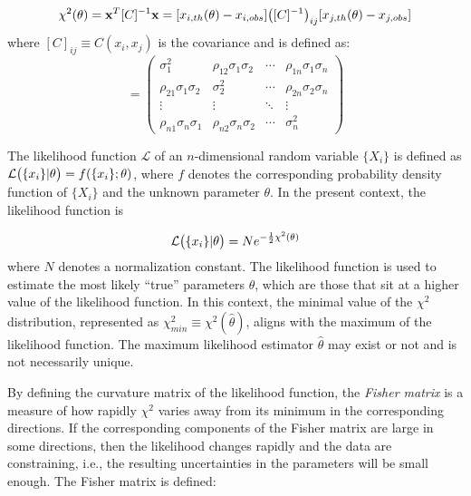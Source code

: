\documentclass[universe,article,accept,moreauthors,pdftex]{Definitions/mdpi}
\begin{document}
\begin{equation}
     \chi^{2}(\theta)=\textbf{x}^{T}[C]^{-1}\textbf{x}=[x_{i,th}(\theta)-x_{i,obs}]\big{(}[C]^{-1}\big{)}_{ij}[x_{j,th}(\theta)-x_{j,obs}]
 \end{equation}
where $[C]_{ij}\equiv C(x_{i},x_{j})$ is the covariance and is defined as:
\begin{equation}
    [C] = 
 \begin{pmatrix}
  \sigma^{2}_{1} & \rho_{12} \sigma_{1}\sigma_{2} & \cdots& \rho_{1n} \sigma_{1}\sigma_{n}\\
   \rho_{21} \sigma_{1}\sigma_{2}&\sigma^{2}_{2}  & \cdots& \rho_{2n} \sigma_{2}\sigma_{n}\\
  \vdots  & \vdots  & \ddots & \vdots  \\
    \rho_{n1} \sigma_{n}\sigma_{1}& \rho_{n2} \sigma_{n}\sigma_{2} & \cdots& \sigma^{2}_{n} 
 \end{pmatrix}
\end{equation}

The likelihood function $\mathcal{L}$ of an $n$-dimensional random variable $\{X_{i}\}$ is defined as $\mathcal{L}\big{(} \{x_{i}\}|\theta\big{)}=f(\{x_{i}\};\theta)$, where $f$ denotes  the corresponding probability density function of $\{X_{i}\}$ and the unknown parameter $\theta$. In the present context, the likelihood function is 

\begin{equation}
    \mathcal{L}\big{(} \{x_{i}\}|\theta\big{)}= N e^{-\frac{1}{2}\chi^{2}(\theta)}
\end{equation}
 where $N$ denotes a normalization constant. The likelihood function is used to estimate the most likely ``true'' parameters $\theta$, which are those that sit at a higher value of the likelihood function. In this context, the minimal value of the $\chi^{2}$ distribution, represented as $\chi^{2}_{min} \equiv \chi^{2}(\hat{\theta})$, aligns with the maximum of the likelihood function.  The maximum likelihood estimator $\hat{\theta}$ may exist or not and is not necessarily unique.

By defining the curvature matrix of the likelihood function, the \textit{Fisher matrix}  is a measure of how rapidly $\chi^{2}$ varies away from its minimum in the corresponding directions. If the corresponding components of the Fisher matrix are large in some directions, then the likelihood changes rapidly and the data are constraining, i.e., the resulting uncertainties in the parameters will be small enough. The Fisher matrix is defined:
\end{document}

